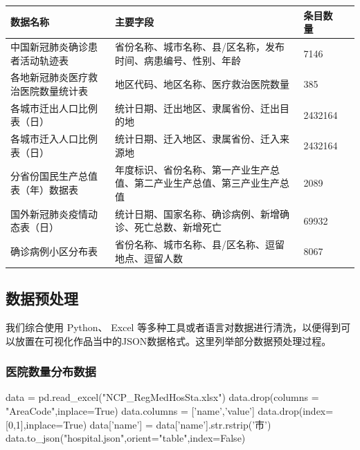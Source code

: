 \documentclass{ctexart}
\begin{document}
\begin{table}[!htbp]
    \begin{tabular}{p{100pt}p{230pt}p{60pt}p{130pt}}
        \hline
        数据名称                           & 主要字段                                                                 & 条目数量 \\ \hline
        中国新冠肺炎确诊患者活动轨迹表     & 省份名称、城市名称、县/区名称，发布时间、病患编号、性别、年龄            & 7146     \\
        各地新冠肺炎医疗救治医院数量统计表 & 地区代码、地区名称、医疗救治医院数量                                     & 385      \\
        各城市迁出人口比例表（日）         & 统计日期、迁出地区、隶属省份、迁出目的地                                 & 2432164  \\
        各城市迁入人口比例表（日）         & 统计日期、迁入地区、隶属省份、迁入来源地                                 & 2432164  \\
        分省份国民生产总值表（年）数据表   & 年度标识、省份名称、第一产业生产总值、第二产业生产总值、第三产业生产总值 & 2089     \\
        国外新冠肺炎疫情动态表（日）       & 统计日期、国家名称、确诊病例、新增确诊、死亡总数、新增死亡               & 69932    \\
        确诊病例小区分布表                 & 省份名称、城市名称、县/区名称、逗留地点、逗留人数                        & 8067     \\ \hline
    \end{tabular}
\end{table}
\newpage
\subsection{数据预处理}
我们综合使用 Python、 Excel 等多种工具或者语言对数据进行清洗，以便得到可以放置在可视化作品当中的JSON数据格式。这里列举部分数据预处理过程。
\subsubsection{医院数量分布数据}
\begin{python}
data = pd.read_excel("NCP_RegMedHosSta.xlsx")
data.drop(columns = "AreaCode",inplace=True)
data.columns = ['name','value']
data.drop(index=[0,1],inplace=True)
data['name'] = data['name'].str.rstrip('市') 
data.to_json("hospital.json",orient="table",index=False)
\end{python}
\end{document}
